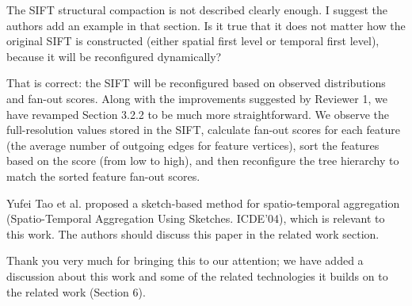 \documentclass{article}
\begin{document}
The SIFT structural compaction is not described clearly enough. I
suggest the authors add an example in that section. Is it true that it
does not matter how the original SIFT is constructed (either spatial
first level or temporal first level), because it will be reconfigured
dynamically?

\begin{tcolorbox}
That is correct: the SIFT will be reconfigured based on observed
distributions and fan-out scores. Along with the improvements suggested
by Reviewer 1, we have revamped Section 3.2.2 to be much more
straightforward. We observe the full-resolution values stored in the
SIFT, calculate fan-out scores for each feature (the average number of
outgoing edges for feature vertices), sort the features based on the
score (from low to high), and then reconfigure the tree hierarchy to
match the sorted feature fan-out scores.
\end{tcolorbox}

Yufei Tao et al. proposed a sketch-based method for spatio-temporal
aggregation (Spatio-Temporal Aggregation Using Sketches. ICDE'04), which
is relevant to this work. The authors should discuss this paper in the
related work section.

\begin{tcolorbox}
Thank you very much for bringing this to our attention; we have added a
discussion about this work and some of the related technologies it
builds on to the related work (Section 6).
\end{tcolorbox}
\end{document}
